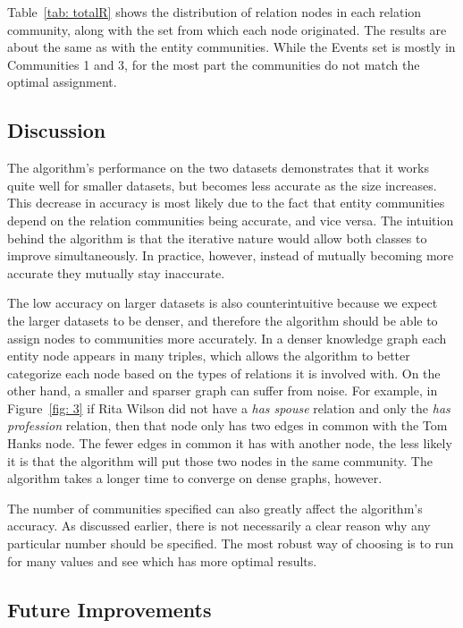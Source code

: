 \documentclass[12pt]{article}
\begin{document}
Table~\ref{tab: totalR} shows the distribution of relation nodes in each
relation community, along with the set from which each node originated. The
results are about the same as with the entity communities. While the Events set
is mostly in Communities 1 and 3, for the most part the communities do not
match the optimal assignment.

\subsection{Discussion}
\label{Discussion}

The algorithm's performance on the two datasets demonstrates that it works quite
well for smaller datasets, but becomes less accurate as the size increases. This
decrease in accuracy is most likely due to the fact that entity communities depend
on the relation communities being accurate, and vice versa. The intuition behind
the algorithm is that the iterative nature would allow both classes to improve
simultaneously. In practice, however, instead of mutually becoming more accurate
they mutually stay inaccurate.

The low accuracy on larger datasets is also counterintuitive because we expect
the larger datasets to be denser, and therefore the algorithm should be able to
assign nodes to communities more accurately. In a denser knowledge graph each
entity node appears in many triples, which allows the algorithm to better
categorize each node based on the types of relations it is involved with. On the
other hand, a smaller and sparser graph can suffer from noise. For example, in
Figure~\ref{fig: 3} if Rita Wilson did not have a \textit{has spouse} relation
and only the \textit{has profession} relation, then that node only has two edges
in common with the Tom Hanks node. The fewer edges in common it has with another
node, the less likely it is that the algorithm will put those two nodes in the
same community. The algorithm takes a longer time to converge on dense graphs,
however.

The number of communities specified can also greatly affect the algorithm's
accuracy. As discussed earlier, there is not necessarily a clear reason why
any particular number should be specified. The most robust way of choosing is
to run for many values and see which has more optimal results.

\subsection{Future Improvements}
\label{Future Improvements}
\end{document}
